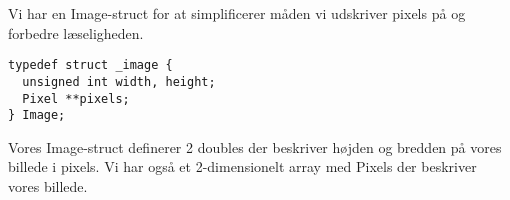 Vi har en Image-struct for at simplificerer måden vi udskriver pixels på og forbedre læseligheden.

\begin{lstlisting}[style=Cstyle, caption=Image definitionen]
typedef struct _image {
  unsigned int width, height;
  Pixel **pixels;
} Image;
\end{lstlisting}

Vores Image-struct definerer 2 doubles der beskriver højden og bredden på vores billede i pixels.
Vi har også et 2-dimensionelt array med Pixels der beskriver vores billede.